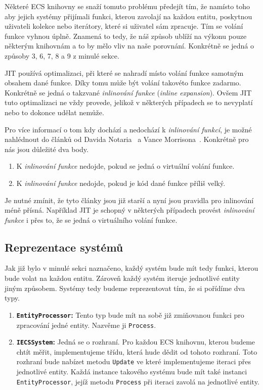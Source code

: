 Některé ECS knihovny se snaží tomuto problému předejít tím, že namísto toho aby jejich systémy přijímali funkci, kterou zavolají na každou entitu, poskytnou uživateli kolekce nebo iterátory, které si uživatel sám zpracuje. Tím se volání funkce vyhnou úplně. Znamená to tedy, že náš způsob ublíží na výkonu pouze některým knihovnám a to by mělo vliv na naše porovnání. Konkrétně se jedná o způsoby 3, 6, 7, 8 a 9 z minulé sekce.

JIT používá optimalizaci, při které se nahradí místo volání funkce samotným obsahem dané funkce. Díky tomu může být volání takovéto funkce zadarmo. Konkrétně se jedná o takzvané \textit{inlinování funkce} (\textit{inline expansion}). Ovšem JIT tuto optimalizaci ne vždy provede, jelikož v některých případech se to nevyplatí nebo to dokonce udělat nemůže.

Pro více informací o tom kdy dochází a nedochází k \textit{inlinování funkcí}, je možné nahlédnout do článků od Davida Notaria~\cite{Notario_2004} a Vance Morrisona~\cite{Morrison_2008}. Konkrétně pro nás jsou důležité dva body.

\begin{enumerate}
    \item K \textit{inlinování funkce} nedojde, pokud se jedná o virtuální volání funkce.
    \item K \textit{inlinování funkce} nedojde, pokud je kód dané funkce příliš velký.
\end{enumerate}

Je nutné zmínit, že tyto články jsou již starší a nyní jsou pravidla pro inlinování méně přísná. Například JIT je schopný v některých případech provést \textit{inlinování funkce} i přes to, že se jedná o virtuálního volání funkce.

\subsection{Reprezentace systémů}
Jak již bylo v minulé sekci naznačeno, každý systém bude mít tedy funkci, kterou bude volat na každou entitu. Zároveň každý systém iteruje jednotlivé entity jiným způsobem. Systémy tedy budeme reprezentovat tím, že si pořídíme dva typy.

\begin{enumerate}
    \item \textbf{\texttt{EntityProcessor}:} Tento typ bude mít na sobě již zmiňovanou funkci pro zpracování jedné entity. Nazvěme ji \verb|Process|.
    \item \textbf{\texttt{IECSSystem}:} Jedná se o rozhraní. Pro každou ECS knihovnu, kterou budeme chtít měřit, implementujeme třídu, která hude dědit od tohoto rozhraní. Toto rozhraní bude nabízet metodu \verb|Update| ve které implementujeme iteraci přes jednotlivé entity. Každá instance takového systému bude mít také instanci \verb|EntityProcessor|, jejíž metodu \verb|Process| při iteraci zavolá na jednotlivé entity.
\end{enumerate}

